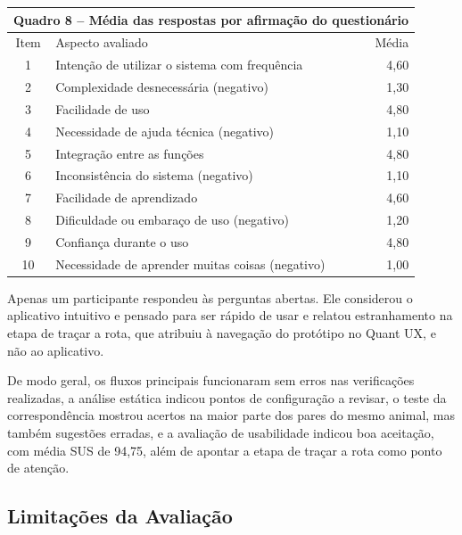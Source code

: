 \begin{table}[H]
    \centering
    \hypertarget{quadro:medias_itens_sus}{}\label{quadro:medias_itens_sus}
    \small
    \renewcommand{\arraystretch}{1.15}
    \begin{tabular}{|c|p{9.0cm}|r|}
        \hline
        \multicolumn{3}{|c|}{Quadro 8 -- Média das respostas por afirmação do questionário} \\ \hline
        Item & Aspecto avaliado & Média \\ \hline
        1 & Intenção de utilizar o sistema com frequência & 4,60 \\ \hline
        2 & Complexidade desnecessária (negativo) & 1,30 \\ \hline
        3 & Facilidade de uso & 4,80 \\ \hline
        4 & Necessidade de ajuda técnica (negativo) & 1,10 \\ \hline
        5 & Integração entre as funções & 4,80 \\ \hline
        6 & Inconsistência do sistema (negativo) & 1,10 \\ \hline
        7 & Facilidade de aprendizado & 4,60 \\ \hline
        8 & Dificuldade ou embaraço de uso (negativo) & 1,20 \\ \hline
        9 & Confiança durante o uso & 4,80 \\ \hline
        10 & Necessidade de aprender muitas coisas (negativo) & 1,00 \\ \hline
    \end{tabular}
\end{table}

Apenas um participante respondeu às perguntas abertas. Ele considerou o aplicativo intuitivo e pensado para ser rápido de usar e relatou estranhamento na etapa de traçar a rota, que atribuiu à navegação do protótipo no Quant UX, e não ao aplicativo.

De modo geral, os fluxos principais funcionaram sem erros nas verificações realizadas, a análise estática indicou pontos de configuração a revisar, o teste da correspondência mostrou acertos na maior parte dos pares do mesmo animal, mas também sugestões erradas, e a avaliação de usabilidade indicou boa aceitação, com média SUS de 94,75, além de apontar a etapa de traçar a rota como ponto de atenção.

\subsection{Limitações da Avaliação}

